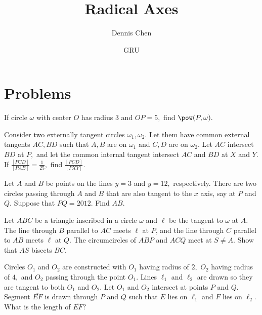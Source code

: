 \documentclass[mast]{lucky}
\title{Radical Axes}
\author{Dennis Chen}
\date{GRU}
\begin{document}
\maketitle



\pagebreak
\section{Problems}


\begin{prob}[]{1}
If circle $\omega$ with center $O$ has radius $3$ and $OP=5,$ find $\pow(P,\omega).$
\end{prob}

\begin{prob}[]{1}
Consider two externally tangent circles $\omega_1,\omega_2.$ Let them have common external tangents $AC,BD$ such that $A,B$ are on $\omega_1$ and $C,D$ are on $\omega_2.$ Let $AC$ intersect $BD$ at $P,$ and let the common internal tangent intersect $AC$ and $BD$ at $X$ and $Y$. If $\frac{[PCD]}{[PAB]}=\frac{1}{25},$ find $\frac{[PCD]}{[PXY]}.$
\end{prob}

\begin{prob}[Mandelbrot 2012]{1}
Let $A$ and $B$ be points on the lines $y=3$ and $y=12,$ respectively. There are two circles passing through $A$ and $B$ that are also tangent to the $x$ axis, say at $P$ and $Q.$ Suppose that $PQ=2012.$ Find $AB.$
\end{prob}

\begin{prob}[HMMT 2020/T3]{2}
Let $ABC$ be a triangle inscribed in a circle $\omega$ and $\ell$ be the tangent to $\omega$ at $A$. The line through $B$ parallel to $AC$ meets $\ell$ at $P$, and the line through $C$ parallel to $AB$ meets $\ell$ at $Q$. The circumcircles of $ABP$ and $ACQ$ meet at $S\neq A$. Show that $AS$ bisects $BC$.
\end{prob}

\begin{prob}{2}
Circles $O_1$ and $O_2$ are constructed with $O_1$ having radius of $2,$ $O_2$ having radius of $4,$ and $O_2$ passing through the point $O_1.$ Lines $\ell_1$ and $\ell_2$ are drawn so they are tangent to both $O_1$ and $O_2.$ Let $O_1$ and $O_2$ intersect at points $P$ and $Q.$ Segment $\overline{EF}$ is drawn through $P$ and $Q$ such that $E$ lies on $\ell_1$ and $F$ lies on $\ell_2.$ What is the length of $\overline{EF}?$
\end{prob}
\end{document}
